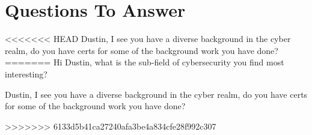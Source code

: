 \documentclass[a4paper]{article}
\begin{document}
\section{Questions To Answer}
<<<<<<< HEAD
Dustin, I see you have a diverse background in the cyber realm, do you have certs for some of the background work you have done?
=======
Hi Dustin, what is the sub-field of cybersecurity you find most interesting?

Dustin, I see you have a diverse background in the cyber realm, do you have certs for some of the background work you have done?

>>>>>>> 6133d5b41ca27240afa3be4a834cfe28f992c307
\end{document}
